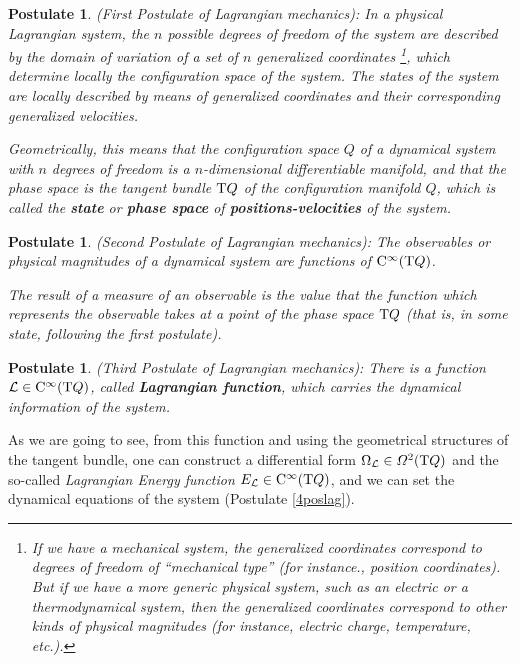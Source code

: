 \documentclass[12pt]{report}
\newtheorem{pos}[teor]{Postulate}
\def\df{{\mit\Omega}}
\def\Lag{{\cal L}}
\def\Tan{{\rm T}}
\def\Cinfty{{\rm C}^\infty}
\begin{document}
\begin{pos}
{\rm (First Postulate of Lagrangian mechanics\/)}:
In a physical Lagrangian system,  the $n$ possible degrees of freedom of the system
are described by the domain of variation of a set of $n$ 
{\sl generalized coordinates}
\footnote{
If we have a mechanical system, the generalized coordinates 
correspond to degrees of freedom of ``mechanical type'' (for instance.,
position coordinates). But if we have a more generic physical system, 
such as an electric or a thermodynamical system,
then the generalized coordinates correspond to other kinds of physical magnitudes
(for instance, electric charge, temperature, etc.).
},
which determine locally the {\sl configuration space} of the system.
The {\rm states} of the system are locally described by means of
generalized coordinates and their corresponding
generalized velocities.

Geometrically, this means that
the configuration space $Q$ of a dynamical system
with $n$ degrees of freedom is a $n$-dimensional differentiable manifold,
and that
the phase space is the tangent bundle $\Tan Q$ of the configuration manifold $Q$,
which is called the
\textbf{state} or \textbf{phase space} of \textbf{positions-velocities} of the system.
\end{pos}

\begin{pos}
{\rm (Second Postulate of Lagrangian mechanics\/)}:
The observables or physical magnitudes of a 
dynamical system are functions of $\Cinfty (\Tan Q)$.

The result of a measure of an observable is the value that the function 
which represents the observable takes at a point of the phase space $\Tan Q$
(that is, in some state, following the first postulate).
\end{pos}

\begin{pos}
{\rm (Third Postulate of Lagrangian mechanics\/)}:
There is a function $\Lag \in \Cinfty (\Tan Q)$, called \textbf{Lagrangian function},
which carries the dynamical information of the system.
\end{pos}

As we are going to see,
from this function and using  the geometrical structures of the
tangent bundle, one can construct a differential form
$\Omega_\Lag\in\df^2(\Tan Q)$ and the so-called
{\sl Lagrangian Energy function} $E_\Lag\in\Cinfty(\Tan Q)$,
and we can set the dynamical equations of the system
(Postulate \ref{4poslag}).
\end{document}
